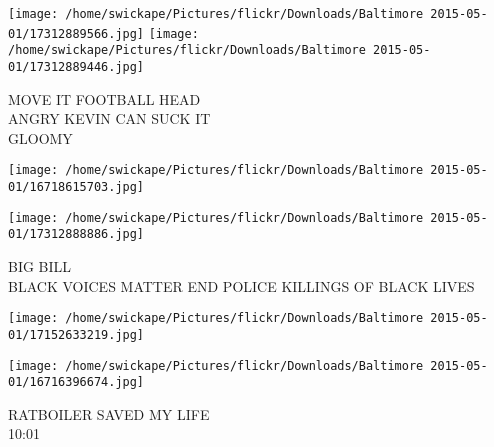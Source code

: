 \documentclass[10pt,letterpaper]{article}
\begin{document}
\vspace{0.25in}
\texttt{[image: /home/swickape/Pictures/flickr/Downloads/Baltimore 2015-05-01/17312889566.jpg]}
\texttt{[image: /home/swickape/Pictures/flickr/Downloads/Baltimore 2015-05-01/17312889446.jpg]}

MOVE IT FOOTBALL HEAD\\
ANGRY KEVIN CAN SUCK IT\\
GLOOMY
\pagebreak

\texttt{[image: /home/swickape/Pictures/flickr/Downloads/Baltimore 2015-05-01/16718615703.jpg]}

\vspace{0.25in}
\texttt{[image: /home/swickape/Pictures/flickr/Downloads/Baltimore 2015-05-01/17312888886.jpg]}

BIG BILL\\
BLACK VOICES MATTER END POLICE KILLINGS OF BLACK LIVES
\pagebreak

\texttt{[image: /home/swickape/Pictures/flickr/Downloads/Baltimore 2015-05-01/17152633219.jpg]}

\vspace{0.25in}
\texttt{[image: /home/swickape/Pictures/flickr/Downloads/Baltimore 2015-05-01/16716396674.jpg]}

RATBOILER SAVED MY LIFE\\
10:01
\pagebreak
\end{document}
